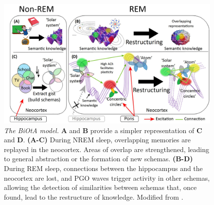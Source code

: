 \begin{figure}[H]
    \centering
    \includegraphics[width=0.9\linewidth]{1_Introduction//IntroImages/Picture6.jpg}
    \caption[\textit{The BiOtA model.}]{\textit{The BiOtA model.} \textbf{A} and \textbf{B} provide a simpler representation of \textbf{C} and \textbf{D}. \textbf{(A-C)} During NREM sleep, overlapping memories are replayed in the neocortex. Areas of overlap are strengthened, leading to general abstraction or the formation of new schemas. \textbf{(B-D)} During REM sleep, connections between the hippocampus and the neocortex are lost, and PGO waves trigger activity in other schemas, allowing the detection of similarities between schemas that, once found, lead to the restructure of knowledge. Modified from \cite{lewis_how_2018}.\vspace{1cm}}
    \label{fig:biota}
\end{figure}
\FloatBarrier

